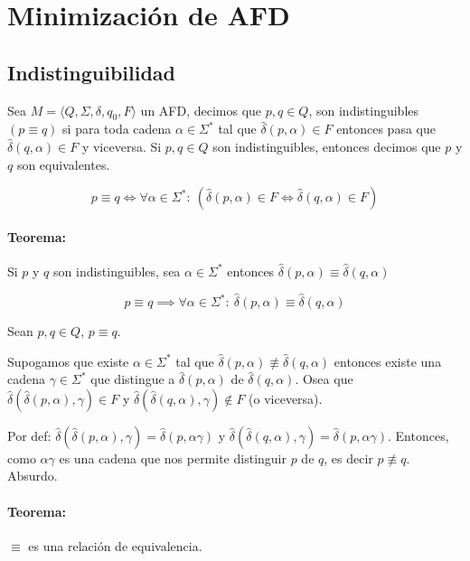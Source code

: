 \newpage
\section{Minimización de AFD}
\subsection{Indistinguibilidad}
Sea \(M=\langle Q, \Sigma, \delta, q_0, F\rangle\) un AFD, decimos que \(p,q\in Q\),  son indistinguibles \((p\equiv q)\) si para toda cadena \(\alpha\in\Sigma^*\) tal que \(\hat\delta(p,\alpha) \in F\) entonces pasa que \(\hat\delta(q,\alpha) \in F\) y viceversa. Si \(p, q\in Q\) son indistinguibles, entonces decimos que \(p\) y \(q\) son equivalentes.

\[ p \equiv q \iff \forall \alpha \in \Sigma^*:~(\hat\delta(p,\alpha) \in F \iff \hat\delta(q,\alpha) \in F)\]

\paragraph{Teorema:} Si \(p\) y \(q\) son indistinguibles, sea \(\alpha\in\Sigma^*\) entonces \(\hat\delta(p,\alpha) \equiv \hat\delta(q,\alpha)\)

\[ p \equiv q \implies \forall \alpha \in \Sigma^*:~\hat\delta(p,\alpha) \equiv \hat\delta(q,\alpha)\]
\begin{demo}
  Sean \(p,q\in Q\), \(p\equiv q\).

  Supogamos que existe \(\alpha\in\Sigma^*\) tal que \(\hat\delta(p, \alpha) \not\equiv \hat\delta(q,\alpha)\) entonces existe una cadena \(\gamma\in\Sigma^*\) que distingue a \(\hat\delta(p,\alpha)\) de \(\hat\delta(q,\alpha)\). Osea que \(\hat\delta(\hat\delta(p,\alpha), \gamma) \in F\) y \(\hat\delta(\hat\delta(q,\alpha), \gamma) \not\in F\) (o viceversa).

  Por def: \(\hat\delta(\hat\delta(p,\alpha),\gamma) = \hat\delta(p,\alpha\gamma)\) y \(\hat\delta(\hat\delta(q,\alpha), \gamma) = \hat\delta(p,\alpha\gamma)\). Entonces, como \(\alpha\gamma\) es una cadena que nos permite distinguir \(p\) de \(q\), es decir \(p \not\equiv q\). Absurdo.
\end{demo}

\paragraph{Teorema:} \(\equiv\) es una relación de equivalencia.

